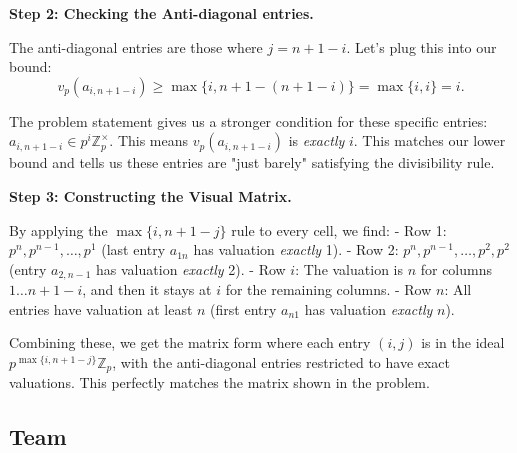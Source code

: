 \begin{solution}
\bigskip

\textbf{Step 2: Checking the Anti-diagonal entries.}

The anti-diagonal entries are those where $j = n+1-i$. Let's plug this into our bound:
\[ v_p(a_{i, n+1-i}) \geq \max\{i, n+1-(n+1-i)\} = \max\{i, i\} = i. \]

\bigskip

The problem statement gives us a stronger condition for these specific entries: $a_{i, n+1-i} \in p^i \mathbb{Z}_p^\times$. This means $v_p(a_{i, n+1-i})$ is \textit{exactly} $i$. This matches our lower bound and tells us these entries are "just barely" satisfying the divisibility rule.

\bigskip

\textbf{Step 3: Constructing the Visual Matrix.}

By applying the $\max\{i, n+1-j\}$ rule to every cell, we find:
- Row 1: $p^n, p^{n-1}, \dots, p^1$ (last entry $a_{1n}$ has valuation \textit{exactly} 1).
- Row 2: $p^n, p^{n-1}, \dots, p^2, p^2$ (entry $a_{2,n-1}$ has valuation \textit{exactly} 2).
- Row $i$: The valuation is $n$ for columns $1 \dots n+1-i$, and then it stays at $i$ for the remaining columns.
- Row $n$: All entries have valuation at least $n$ (first entry $a_{n1}$ has valuation \textit{exactly} $n$).

\bigskip

Combining these, we get the matrix form where each entry $(i, j)$ is in the ideal $p^{\max\{i, n+1-j\}} \mathbb{Z}_p$, with the anti-diagonal entries restricted to have exact valuations. This perfectly matches the matrix shown in the problem.
\end{solution}


\subsection{Team}

